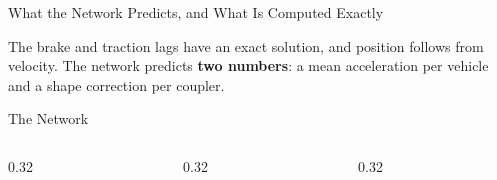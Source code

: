 \documentclass[aspectratio=169,11pt]{beamer}
\begin{document}
\begin{frame}{What the Network Predicts, and What Is Computed Exactly}
  \vspace{0.2em}
  \centering
  \resizebox{0.74\textwidth}{!}{}

  \vspace{0.4em}
  \begin{minipage}{0.92\textwidth}\small
    The brake and traction lags have an exact solution, and position follows
    from velocity. The network predicts \textbf{two numbers}: a mean
    acceleration per vehicle and a shape correction per coupler.
  \end{minipage}
\end{frame}

\begin{frame}{The Network}
  \vspace{0.4em}
  \centering
  \resizebox{\textwidth}{!}{}

  \vspace{0.35em}
  \begin{columns}[T,onlytextwidth]
    \begin{column}{0.32\textwidth}\centering
    \end{column}
    \begin{column}{0.32\textwidth}\centering
    \end{column}
    \begin{column}{0.32\textwidth}\centering
    \end{column}
  \end{columns}
\end{frame}
\end{document}
